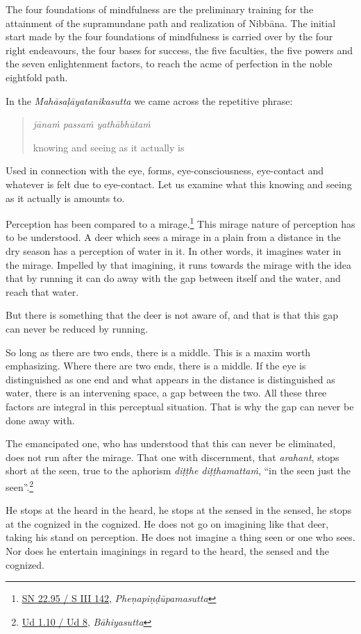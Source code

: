 The four foundations of mindfulness are the preliminary training for the attainment of the supramundane path and realization of Nibbāna. The initial start made by the four foundations of mindfulness is carried over by the four right endeavours, the four bases for success, the five faculties, the five powers and the seven enlightenment factors, to reach the acme of perfection in the noble eightfold path.

In the \emph{Mahāsaḷāyatanikasutta} we came across the repetitive phrase:

\begin{quote}
\emph{jānaṁ passaṁ yathābhūtaṁ}

knowing and seeing as it actually is
\end{quote}

Used in connection with the eye, forms, eye-consciousness, eye-contact and whatever is felt due to eye-contact. Let us examine what this knowing and seeing as it actually is amounts to.

Perception has been compared to a mirage.\footnote{\href{https://suttacentral.net/sn22.95/pli/ms}{SN 22.95 / S III 142}, \emph{Pheṇapiṇḍūpamasutta}} This mirage nature of perception has to be understood. A deer which sees a mirage in a plain from a distance in the dry season has a perception of water in it. In other words, it imagines water in the mirage. Impelled by that imagining, it runs towards the mirage with the idea that by running it can do away with the gap between itself and the water, and reach that water.

But there is something that the deer is not aware of, and that is that this gap can never be reduced by running.

So long as there are two ends, there is a middle. This is a maxim worth emphasizing. Where there are two ends, there is a middle. If the eye is distinguished as one end and what appears in the distance is distinguished as water, there is an intervening space, a gap between the two. All these three factors are integral in this perceptual situation. That is why the gap can never be done away with.

The emancipated one, who has understood that this can never be eliminated, does not run after the mirage. That one with discernment, that \emph{arahant}, stops short at the seen, true to the aphorism \emph{diṭṭhe diṭṭhamattaṁ}, ``in the seen just the seen''.\footnote{\href{https://suttacentral.net/ud1.10/pli/ms}{Ud 1.10 / Ud 8}, \emph{Bāhiyasutta}}

He stops at the heard in the heard, he stops at the sensed in the sensed, he stops at the cognized in the cognized. He does not go on imagining like that deer, taking his stand on perception. He does not imagine a thing seen or one who sees. Nor does he entertain imaginings in regard to the heard, the sensed and the cognized.

